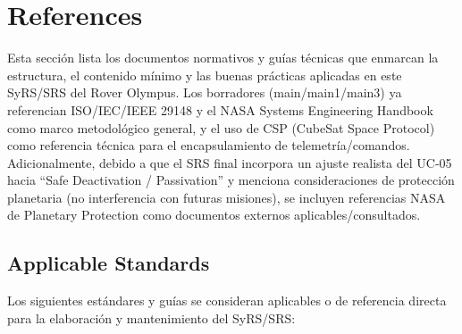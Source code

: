 
\section{References}

Esta sección lista los documentos normativos y guías técnicas que enmarcan la estructura, el contenido mínimo y las buenas prácticas aplicadas en este SyRS/SRS del Rover Olympus. \cite{ieee_29148, segoldmine_ppi} 
Los borradores (main/main1/main3) ya referencian ISO/IEC/IEEE 29148 y el NASA Systems Engineering Handbook como marco metodológico general, y el uso de CSP (CubeSat Space Protocol) como referencia técnica para el encapsulamiento de telemetría/comandos. \cite{ieee_29148, nasa_se_handbook} 
Adicionalmente, debido a que el SRS final incorpora un ajuste realista del UC‑05 hacia ``Safe Deactivation / Passivation'' y menciona consideraciones de protección planetaria (no interferencia con futuras misiones), se incluyen referencias NASA de Planetary Protection como documentos externos aplicables/consultados. \cite{nasa_se_handbook, ieee_29148, segoldmine_ppi, nasa_planetary_protection}

\subsection{Applicable Standards}

Los siguientes estándares y guías se consideran aplicables o de referencia directa para la elaboración y mantenimiento del SyRS/SRS:

